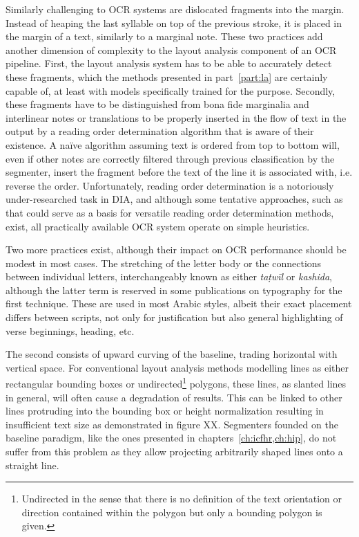 Similarly challenging to OCR systems are dislocated fragments into the margin.
Instead of heaping the last syllable on top of the previous stroke, it is
placed in the margin of a text, similarly to a marginal note. These two
practices add another dimension of complexity to the layout analysis component
of an OCR pipeline. First, the layout analysis system has to be able to
accurately detect these fragments, which the methods presented in
part~\ref{part:la} are certainly capable of, at least with models specifically
trained for the purpose. Secondly, these fragments have to be distinguished
from bona fide marginalia and interlinear notes or translations to be properly
inserted in the flow of text in the output by a reading order determination
algorithm that is aware of their existence. A naïve algorithm assuming text is
ordered from top to bottom will, even if other notes are correctly filtered
through previous classification by the segmenter, insert the fragment before
the text of the line it is associated with, i.e. reverse the order.
Unfortunately, reading order determination is a notoriously under-researched
task in DIA, and although some tentative approaches, such as
\cite{dejean2019versatile} that could serve as a basis for versatile reading
order determination methods, exist, all practically available OCR system
operate on simple heuristics.

Two more practices exist, although their impact on OCR performance should be
modest in most cases. The stretching of the letter body or the connections
between individual letters, interchangeably known as either \emph{taṭwīl} or
\emph{kashida}, although the latter term is reserved in some publications on
typography for the first technique. These are used in most Arabic styles,
albeit their exact placement differs between scripts, not only for
justification but also general highlighting of verse beginnings, heading, etc. 

The second consists of upward curving of the baseline, trading horizontal with
vertical space. For conventional layout analysis methods modelling lines as
either rectangular bounding boxes or undirected\footnote{Undirected in the
sense that there is no definition of the text orientation or direction
contained within the polygon but only a bounding polygon is given.} polygons,
these lines, as slanted lines in general, will often cause a degradation of
results. This can be linked to other lines protruding into the bounding box or
height normalization resulting in insufficient text size as demonstrated in
figure XX. Segmenters founded on the baseline paradigm, like the ones presented
in chapters~\ref{ch:icfhr,ch:hip}, do not suffer from this problem as they
allow projecting arbitrarily shaped lines onto a straight line.

